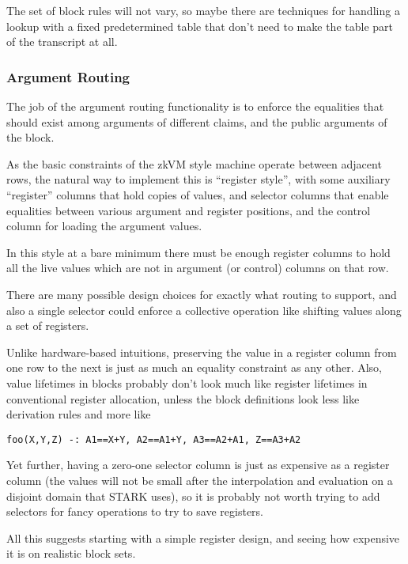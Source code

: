 \documentclass{article}
\theoremstyle{plain}
\theoremstyle{definition}
\begin{document}
The set of block rules will not vary, so maybe there are techniques for
handling a lookup with a fixed predetermined table that don't need to
make the table part of the transcript at all.

\subsubsection{Argument Routing}\label{argument-routing}

The job of the argument routing functionality is to enforce the
equalities that should exist among arguments of different claims, and
the public arguments of the block.

As the basic constraints of the zkVM style machine operate between
adjacent rows, the natural way to implement this is ``register style'',
with some auxiliary ``register'' columns that hold copies of values, and
selector columns that enable equalities between various argument and
register positions, and the control column for loading the argument
values.

In this style at a bare minimum there must be enough register columns to
hold all the live values which are not in argument (or control) columns
on that row.

There are many possible design choices for exactly what routing to
support, and also a single selector could enforce a collective operation
like shifting values along a set of registers.

Unlike hardware-based intuitions, preserving the value in a register
column from one row to the next is just as much an equality constraint
as any other. Also, value lifetimes in blocks probably don't look much
like register lifetimes in conventional register allocation, unless the
block definitions look less like derivation rules and more like

\begin{verbatim}
foo(X,Y,Z) -: A1==X+Y, A2==A1+Y, A3==A2+A1, Z==A3+A2
\end{verbatim}

Yet further, having a zero-one selector column is just as
expensive as a register column (the values will not be small after the
interpolation and evaluation on a disjoint domain that STARK uses), so
it is probably not worth trying to add selectors for fancy operations to
try to save registers.

All this suggests starting with a simple register design, and seeing how
expensive it is on realistic block sets.
\end{document}
